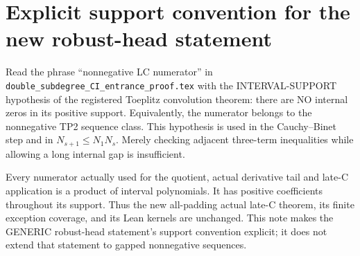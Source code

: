 \section{Explicit support convention for the new robust-head statement}
Read the phrase ``nonnegative LC numerator'' in
\texttt{double\_subdegree\_CI\_entrance\_proof.tex} with the
INTERVAL-SUPPORT hypothesis of the registered Toeplitz convolution
theorem: there are NO internal zeros in its positive support.
Equivalently, the numerator belongs to the nonnegative TP2 sequence
class. This hypothesis is used in the Cauchy--Binet step and in
$N_{s+1}\le N_1N_s$. Merely checking adjacent three-term
inequalities while allowing a long internal gap is insufficient.

Every numerator actually used for the quotient, actual derivative
tail and late-C application is a product of interval polynomials.
It has positive coefficients throughout its support. Thus the new
all-padding actual late-C theorem, its finite exception coverage,
and its Lean kernels are unchanged. This note makes the GENERIC
robust-head statement's support convention explicit; it does not
extend that statement to gapped nonnegative sequences.
